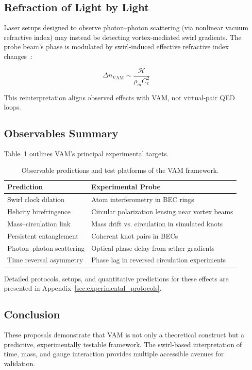 \documentclass[preprint]{revtex4-2}
\begin{document}
    \subsection{Refraction of Light by Light}
    Laser setups designed to observe photon–photon scattering (via nonlinear vacuum refractive index) may instead be detecting vortex-mediated swirl gradients. The probe beam’s phase is modulated by swirl-induced effective refractive index changes~\cite{sarazin2016refraction}:

    \[
        \Delta n_{\text{VAM}} \sim \frac{\mathcal{H}}{\rho_{\scriptscriptstyle\boldsymbol\!m} C_e^2}
    \]

    This reinterpretation aligns observed effects with VAM, not virtual-pair QED loops.

    \subsection{Observables Summary}
    Table~\ref{tab:observable_tests} outlines VAM’s principal experimental targets.

    \begin{table}[H]
        \centering
        \begin{tabular}{|l|p{9cm}|}
            \hline
            \textbf{Prediction} & \textbf{Experimental Probe} \\
            \hline
            Swirl clock dilation & Atom interferometry in BEC rings \\
            Helicity birefringence & Circular polarization lensing near vortex beams \\
            Mass–circulation link & Mass drift vs. circulation in simulated knots \\
            Persistent entanglement & Coherent knot pairs in BECs \\
            Photon–photon scattering & Optical phase delay from æther gradients \\
            Time reversal asymmetry & Phase lag in reversed circulation experiments \\
            \hline
        \end{tabular}
        \caption{Observable predictions and test platforms of the VAM framework.}
        \label{tab:observable_tests}
    \end{table}
    Detailed protocols, setups, and quantitative predictions for these effects are presented in Appendix~\ref{sec:experimental_protocols}.

    \subsection*{Conclusion}
    These proposals demonstrate that VAM is not only a theoretical construct but a predictive, experimentally testable framework. The swirl-based interpretation of time, mass, and gauge interaction provides multiple accessible avenues for validation.
\end{document}
